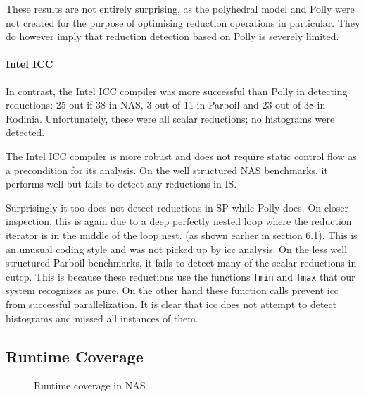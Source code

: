 These results are not entirely surprising, as the polyhedral model and Polly were not created for the purpose of optimising reduction operations in particular.
They do however imply that reduction detection based on Polly is severely limited.

\paragraph*{Intel ICC}
In contrast, the Intel ICC compiler was more successful than Polly in detecting 
reductions: 25  out if 38 in NAS, 3 out of 11 in Parboil and 23 out of 38 in Rodinia.
Unfortunately, these were all scalar reductions; no histograms were detected.

The Intel ICC compiler is more robust and does not require static
control flow as a precondition for its analysis. On the well
structured NAS benchmarks, it performs well but fails to detect any
reductions in IS.

Surprisingly it too does not detect reductions in SP while Polly does. On
closer inspection, this is again due to a deep perfectly nested loop where
the reduction iterator is in the middle of the loop nest. (as shown
earlier in section 6.1).  This is an unusual coding style and was not
picked up by icc analysis. On the less well structured Parboil
benchmarks, it fails to detect many of the scalar reductions in cutcp.
This is because these reductions use the functions \texttt{fmin} and
\texttt{fmax} that our system recognizes as pure.  On the other hand
these function calls prevent icc from successful parallelization.
 It is clear that icc does not attempt to detect
histograms and missed all instances of them.

\subsection{Runtime Coverage}

\begin{figure}[p]
  \centering
    \caption{Runtime coverage in NAS}
    \label{npb_coverage}
\end{figure}

